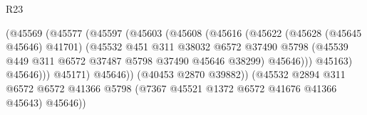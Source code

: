 \begin{lexlean}{R23}
\begin{coremodule}
                                                  (@45569
                                                    (@45577
                                                      (@45597
                                                        (@45603
                                                          (@45608
                                                            (@45616
                                                              (@45622
                                                                (@45628 (@45645 @45646) @41701)
                                                                (@45532
                                                                  @451
                                                                  @311
                                                                  @38032
                                                                  @6572
                                                                  @37490
                                                                  @5798
                                                                  (@45539
                                                                    @449
                                                                    @311
                                                                    @6572
                                                                    @37487
                                                                    @5798
                                                                    @37490
                                                                    @45646
                                                                    @38299)
                                                                  @45646)))
                                                            @45163)
                                                          @45646)))
                                                    @45171)
                                                  @45646))
                                              (@40453 @2870 @39882))
                                            (@45532
                                              @2894
                                              @311
                                              @6572
                                              @6572
                                              @41366
                                              @5798
                                              (@7367 @45521 @1372 @6572 @41676 @41366 @45643)
                                              @45646))

\end{coremodule}
\end{lexlean}
